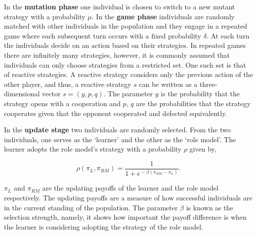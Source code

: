\documentclass[11pt]{article}
\theoremstyle{plainCl1}
\theoremstyle{plainCl2}
\begin{document}
In the \textbf{mutation phase} one individual is
chosen to switch to a new mutant strategy with a probability \(\mu\).
In the \textbf{game phase} individuals are randomly matched with other
individuals in the population and they engage in a repeated game where each
subsequent turn occurs with a fixed probability \(\delta\). At each turn the
individuals decide on an action based on their strategies.
In repeated games there are infinitely many strategies, however, it is commonly
assumed that individuals can only choose strategies from a restricted set. One
such set is that of reactive strategies. A reactive
strategy considers only the previous action of the other player, and thus, a
reactive strategy \(s\) can be written as a three-dimensional vector \(s=(y, p,
q)\). The parameter \(y\) is the probability that the strategy opens with a
cooperation and \(p\), \(q\) are the probabilities that the strategy cooperates
given that the opponent cooperated and defected equivalently.

In the \textbf{update stage} two individuals are randomly selected. From
the two individuals, one  serves as the `learner' and the other as the `role
model'. The learner adopts the role model's strategy with a probability \(\rho\)
given by,

\begin{equation} \label{Eq:rho}
    \rho(\pi_{L}, \pi_{RM}) = \frac{1}{1\!+\! e^{\!-\!\beta (\pi_{RM}\!-\! \pi_{L})}}.
\end{equation}

\(\pi_{L}\) and \(\pi_{RM}\) are the updating payoffs of the learner and the
role model respectively. The updating payoffs are a measure of how successful
individuals are in the current standing of the population. The parameter
\(\beta\) is known as the selection strength, namely, it shows how important the
payoff difference is when the learner is considering adopting the strategy of
the role model.
\end{document}
